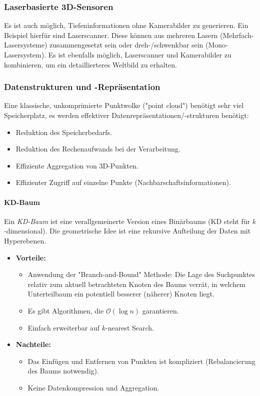 			\subsubsection{Laserbasierte 3D-Sensoren}
				Es ist auch möglich, Tiefeninformationen ohne Kamerabilder zu generieren. Ein Beispiel hierfür sind Laserscanner. Diese können aus mehreren Lasern (Mehrfach-Lasersysteme) zusammengesetzt sein oder dreh-/schwenkbar sein (Mono-Lasersystem). Es ist ebenfalls möglich, Laserscanner und Kamerabilder zu kombinieren, um ein detaillierteres Weltbild zu erhalten.

			\subsubsection{Datenstrukturen und -Repräsentation}
				Eine klassische, unkomprimierte Punktwolke ("point cloud") benötigt sehr viel Speicherplatz, \dh es werden effektiver Datenrepräsentationen/-strukturen benötigt:
				\begin{itemize}
					\item Reduktion des Speicherbedarfs.
					\item Reduktion des Rechenaufwands bei der Verarbeitung.
					\item Effiziente Aggregation von 3D-Punkten.
					\item Effizienter Zugriff auf einzelne Punkte (\zB Nachbarschaftsinformationen).
				\end{itemize}

				\paragraph{KD-Baum}
					Ein \emph{KD-Baum} ist eine verallgemeinerte Version eines Binärbaums (KD steht für \(k\)-dimensional). Die geometrische Idee ist eine rekursive Aufteilung der Daten mit Hyperebenen.

					\begin{itemize}
						\item \textbf{Vorteile:}
							\begin{itemize}
								\item Anwendung der "Branch-and-Bound" Methode: Die Lage des Suchpunktes relativ zum aktuell betrachteten Knoten des Baums verrät, in welchem Unterteilbaum ein potentiell besserer (näherer) Knoten liegt.
								\item Es gibt Algorithmen, die \( \mathcal{O}(\log n) \) garantieren.
								\item Einfach erweiterbar auf \(k\)-nearest Search.
							\end{itemize}
						\item \textbf{Nachteile:}
							\begin{itemize}
								\item Das Einfügen und Entfernen von Punkten ist kompliziert (\ggf Rebalancierung des Baums notwendig).
								\item Keine Datenkompression und Aggregation.
							\end{itemize}
					\end{itemize}

